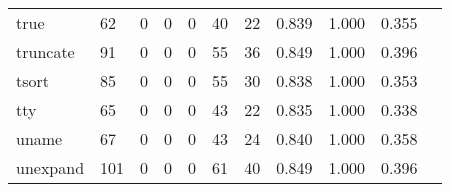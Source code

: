 \begin{longtable}{lp{1.2cm}p{1.2cm}p{1.2cm}p{1.2cm}p{1.2cm}p{1.2cm}p{1.2cm}p{1.2cm}p{1.2cm}p{1.2cm}}
true      &                                    62 &                                                  0 &                                                  0 &                                                  0 &                                                 40 &                                                 22 &                                         0.839 &                                              1.000 &                                              0.355 \\
truncate  &                                    91 &                                                  0 &                                                  0 &                                                  0 &                                                 55 &                                                 36 &                                         0.849 &                                              1.000 &                                              0.396 \\
tsort     &                                    85 &                                                  0 &                                                  0 &                                                  0 &                                                 55 &                                                 30 &                                         0.838 &                                              1.000 &                                              0.353 \\
tty       &                                    65 &                                                  0 &                                                  0 &                                                  0 &                                                 43 &                                                 22 &                                         0.835 &                                              1.000 &                                              0.338 \\
uname     &                                    67 &                                                  0 &                                                  0 &                                                  0 &                                                 43 &                                                 24 &                                         0.840 &                                              1.000 &                                              0.358 \\
unexpand  &                                   101 &                                                  0 &                                                  0 &                                                  0 &                                                 61 &                                                 40 &                                         0.849 &                                              1.000 &                                              0.396 \\

\end{longtable}
